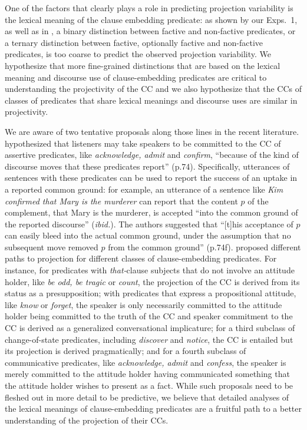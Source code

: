 \documentclass[11pt,fleqn]{article}
\newcommand{\6}{\mbox{$[\hspace*{-.6mm}[$}}
\newcommand{\9}{\mbox{$]\hspace*{-.6mm}]$}}
\begin{document}
{One of the factors that clearly plays a role in predicting projection variability is the lexical meaning of the clause embedding predicate: as shown by our Exps.~1, as well as in \citealt{tbd-variability}, a binary distinction between factive and non-factive predicates, or a ternary distinction between factive, optionally factive and non-factive predicates, is too coarse to predict the observed projection variability. We hypothesize that more fine-grained distinctions that are based on the lexical meaning and discourse use of clause-embedding predicates are critical to understanding the projectivity of the CC and we also hypothesize that the CCs of classes of predicates that share lexical meanings and discourse uses are similar in projectivity. 

We are aware of two tentative proposals along those lines in the recent literature. \citet{anand-hacquard2014} hypothesized that listeners may take speakers to be committed to the CC of assertive predicates, like {\em acknowledge, admit} and {\em confirm},  ``because of the kind of discourse moves that these predicates report'' (p.74). Specifically, utterances of sentences with these predicates can be used to report the success of an uptake in a reported common ground: for example, an utterance of a sentence like {\em Kim confirmed that Mary is the murderer} can report that the content $p$ of the  complement, that Mary is the murderer, is accepted ``into the common ground of the reported discourse'' ({\em ibid.}). The authors suggested that ``[t]his acceptance of $p$ can easily bleed into the actual common ground, under the assumption that no subsequent move removed $p$ from the common ground'' (p.74f). \citet{karttunen2016}  proposed different paths to projection for different classes of clause-embedding predicates. For instance, for predicates with {\em that-}clause subjects that do not involve an attitude holder, like {\em be odd, be tragic} or {\em count}, the projection of the CC is derived from its status as a presupposition; with predicates that express a propositional attitude, like {\em know} or {\em forget}, the speaker is only necessarily committed to the attitude holder being committed to the truth of the CC and speaker commitment to the CC is derived as a generalized conversational implicature; for a third subclass of change-of-state predicates, including {\em discover} and {\em notice}, the CC is entailed but its projection is derived pragmatically; and for a fourth subclass of communicative predicates, like {\em acknowledge, admit} and {\em confess}, the speaker is merely committed to the attitude holder having communicated something that the attitude holder wishes to present as a fact. While such proposals need to be fleshed out in more detail to be predictive, we believe that detailed analyses of the lexical meanings of clause-embedding predicates are a fruitful path to a better understanding of the projection of their CCs.


}
\end{document}

